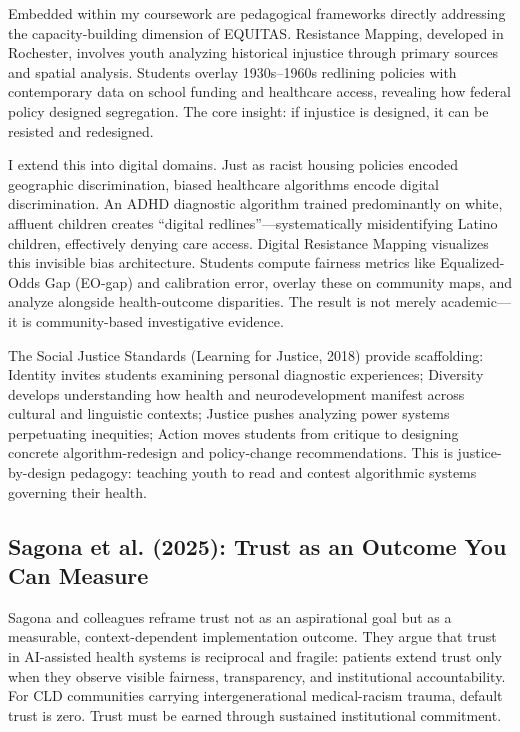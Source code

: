 \documentclass[12pt,a4paper]{article}
\begin{document}
Embedded within my coursework are pedagogical frameworks directly addressing the capacity-building dimension of EQUITAS. Resistance Mapping, developed in Rochester, involves youth analyzing historical injustice through primary sources and spatial analysis. Students overlay 1930s--1960s redlining policies with contemporary data on school funding and healthcare access, revealing how federal policy designed segregation. The core insight: if injustice is designed, it can be resisted and redesigned.

I extend this into digital domains. Just as racist housing policies encoded geographic discrimination, biased healthcare algorithms encode digital discrimination. An ADHD diagnostic algorithm trained predominantly on white, affluent children creates ``digital redlines''—systematically misidentifying Latino children, effectively denying care access. Digital Resistance Mapping visualizes this invisible bias architecture. Students compute fairness metrics like Equalized-Odds Gap (EO-gap) and calibration error, overlay these on community maps, and analyze alongside health-outcome disparities. The result is not merely academic—it is community-based investigative evidence.

The Social Justice Standards (Learning for Justice, 2018) provide scaffolding: Identity invites students examining personal diagnostic experiences; Diversity develops understanding how health and neurodevelopment manifest across cultural and linguistic contexts; Justice pushes analyzing power systems perpetuating inequities; Action moves students from critique to designing concrete algorithm-redesign and policy-change recommendations. This is justice-by-design pedagogy: teaching youth to read and contest algorithmic systems governing their health.

\subsection{Sagona et al. (2025): Trust as an Outcome You Can Measure}

Sagona and colleagues reframe trust not as an aspirational goal but as a measurable, context-dependent implementation outcome. They argue that trust in AI-assisted health systems is reciprocal and fragile: patients extend trust only when they observe visible fairness, transparency, and institutional accountability. For CLD communities carrying intergenerational medical-racism trauma, default trust is zero. Trust must be earned through sustained institutional commitment.
\end{document}

